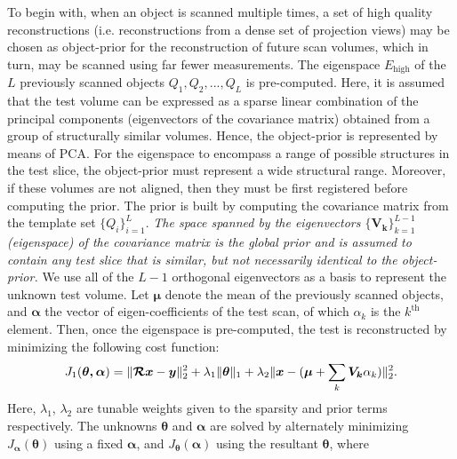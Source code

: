 \documentclass[journal]{IEEEtran}
\begin{document}
To begin with, when an object is scanned multiple times, a set of high quality reconstructions (i.e. reconstructions from a dense set of projection views) may be chosen as object-prior for the reconstruction of future scan volumes, which in turn, may be scanned using far fewer measurements. The eigenspace $E_{\text{high}}$ of the $L$ previously scanned objects $Q_1,Q_2,...,Q_L$ is pre-computed. Here, it is assumed that the test volume can be expressed as a sparse linear combination of the principal components (eigenvectors of the covariance matrix) obtained from a group of structurally similar volumes. Hence, the object-prior is represented by means of PCA. For the eigenspace to encompass a range of possible structures in the test slice, the object-prior must represent a wide structural range. Moreover, if these volumes are not aligned, then they must be first registered before computing the prior. The prior is built by computing the covariance matrix from the template set $\{Q_i\}_{i=1}^L$. \emph{The space spanned by the eigenvectors $\{\boldsymbol{V_k}\}_{k=1}^{L-1}$ (eigenspace) of the covariance matrix is the global prior and is assumed to contain any test slice that is similar, but not necessarily identical to the object-prior.}  We use all of the $L-1$ orthogonal eigenvectors as a basis to represent the unknown test volume. Let $\boldsymbol{\mu}$ denote the mean of the previously scanned objects, and $\boldsymbol{\alpha}$ the vector of eigen-coefficients of the test scan, of which $\alpha_k$ is the $k^{\textrm{th}}$ element. Then, once the eigenspace is pre-computed, the test is reconstructed by minimizing the following cost function:
\vspace{4mm}
 \begin{equation}
   \setlength{\belowdisplayskip}{0pt} \setlength{\belowdisplayshortskip}{0pt}
\setlength{\abovedisplayskip}{-2pt} \setlength{\abovedisplayshortskip}{-2pt}
J_1(\boldsymbol{\theta,\alpha}) = \lVert\boldsymbol{\mathcal{R} x}- \boldsymbol{y}\rVert_2^2  + \lambda_1\lVert\boldsymbol{\theta}\rVert_1+\lambda_2\lVert\boldsymbol{x} - (\boldsymbol{\mu} + \sum_{k}\boldsymbol{V_k}\alpha_k)\rVert_2^2.
\label{Eq:main_prior}
\end{equation}
Here, $\lambda_1$, $\lambda_2$ are tunable weights given to the sparsity and prior terms respectively. The unknowns $\boldsymbol{\theta}$ and $\boldsymbol{\alpha}$
are solved by alternately minimizing $J_{\boldsymbol{\alpha}}(\boldsymbol{\theta})$ using a fixed $\boldsymbol{\alpha}$, and $J_{\boldsymbol\theta}(\boldsymbol{\alpha})$ using the resultant $\boldsymbol{\theta}$, where 
\end{document}
